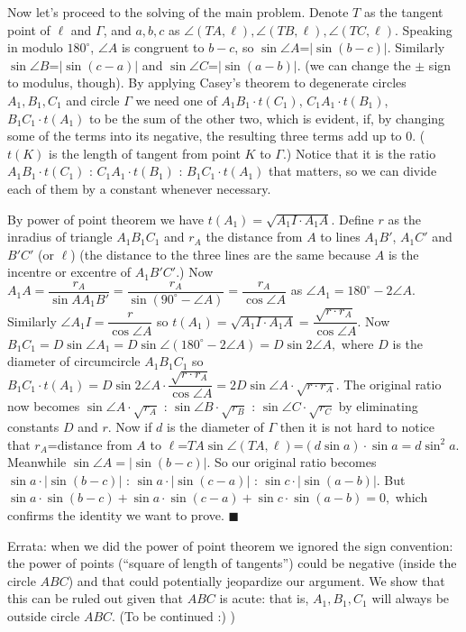 \documentclass[11pt,a4paper]{article}
\begin{document}
\begin{enumerate}
	Now let's proceed to the solving of the main problem. Denote $T$ as the tangent point of $\ell$ and $\Gamma$, and $a,b,c$ as $\angle (TA,\ell),\angle (TB,\ell),\angle (TC,\ell)$. Speaking in modulo $180^{\circ}$, $\angle A$ is congruent to $b-c$, so $\sin\angle A$=$|\sin (b-c)|$. Similarly $\sin\angle B$=$|\sin (c-a)|$ and $\sin\angle C$=$|\sin (a-b)|.$ (we can change the $\pm$ sign to modulus, though). By applying Casey's theorem to degenerate circles $A_1, B_1, C_1$ and circle $\Gamma$ we need one of $A_1B_1\cdot t(C_1)$, $C_1A_1\cdot t(B_1)$, $B_1C_1\cdot t(A_1)$ to be the sum of the other two, which is evident, if, by changing some of the terms into its negative, the resulting three terms add up to 0. ($t(K)$ is the length of tangent from point $K$ to $\Gamma$.) Notice that it is the ratio $A_1B_1\cdot t(C_1)$ : $C_1A_1\cdot t(B_1)$ : $B_1C_1\cdot t(A_1)$ that matters, so we can divide each of them by a constant whenever necessary.
	
	By power of point theorem we have $t(A_1)=\sqrt {A_1I\cdot A_1A}.$ Define $r$ as the inradius of triangle $A_1B_1C_1$ and $r_A$ the distance from $A$ to lines $A_1B'$, $A_1C'$ and $B'C'$ (or $\ell$) (the distance to the three lines are the same because $A$ is the incentre or excentre of $A_1B'C'$.) Now $A_1A=\dfrac{r_A}{\sin AA_1B'}=\dfrac{r_A}{\sin (90^{\circ}-\angle A)}=\dfrac{r_A}{\cos \angle A}$ as $\angle A_1=180^{\circ}-2\angle A.$ Similarly $\angle A_1I=\dfrac{r}{\cos \angle A}$ so $t(A_1)=\sqrt {A_1I\cdot A_1A}=\dfrac{\sqrt{r\cdot r_A}}{\cos \angle A}$. Now $B_1C_1=D\sin\angle A_1=D\sin\angle (180^{\circ}-2\angle A)=D\sin 2\angle A,$ where $D$ is the diameter of circumcircle $A_1B_1C_1$ so $B_1C_1\cdot t(A_1)=D\sin 2\angle A\cdot \dfrac{\sqrt{r\cdot r_A}}{\cos \angle A}=2D\sin \angle A\cdot\sqrt{r\cdot r_A}.$ The original ratio now becomes $\sin \angle A\cdot\sqrt{r_A}$ : $\sin \angle B\cdot\sqrt{r_B}$ : $\sin \angle C\cdot\sqrt{r_C}$ by eliminating constants $D$ and $r$. Now if $d$ is the diameter of $\Gamma$ then it is not hard to notice that $r_A$=distance from $A$ to $\ell$=$TA\sin\angle (TA,\ell)$=$(d\sin a)\cdot\sin a=d\sin^{2} a.$ Meanwhile $\sin\angle A=|\sin (b-c)|.$ So our original ratio becomes $\sin a\cdot|\sin (b-c)|$ : $\sin a\cdot|\sin (c-a)|$ : $\sin c\cdot|\sin (a-b)|$. But $\sin a\cdot\sin (b-c)+\sin a\cdot\sin (c-a)+\sin c\cdot\sin (a-b)=0,$ which confirms the identity we want to prove. $\blacksquare$
	
	Errata: when we did the power of point theorem we ignored the sign convention: the power of points (``square of length of tangents'') could be negative (inside the circle $ABC$) and that could potentially jeopardize our argument. We show that this can be ruled out given that $ABC$ is acute: that is, $A_1, B_1, C_1$ will always be outside circle $ABC$. (To be continued :) )
	
\end{enumerate}
\end{document}
